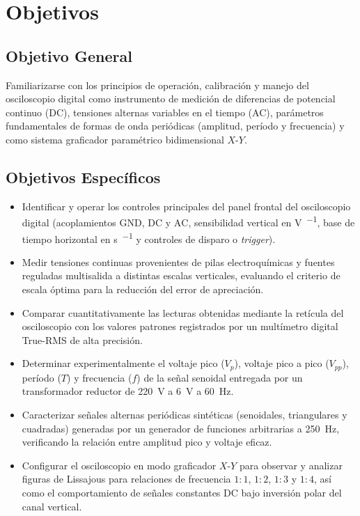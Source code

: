 
\section{Objetivos}
\label{sec:objetivos}

\subsection{Objetivo General}
Familiarizarse con los principios de operación, calibración y manejo del osciloscopio digital como instrumento de medición de diferencias de potencial continuo (DC), tensiones alternas variables en el tiempo (AC), parámetros fundamentales de formas de onda periódicas (amplitud, período y frecuencia) y como sistema graficador paramétrico bidimensional $X$-$Y$.

\subsection{Objetivos Específicos}
\begin{itemize}
    \item Identificar y operar los controles principales del panel frontal del osciloscopio digital (acoplamientos $\text{GND}$, $\text{DC}$ y $\text{AC}$, sensibilidad vertical en \unit{\volt\per\division}, base de tiempo horizontal en \unit{\second\per\division} y controles de disparo o \textit{trigger}).
    \item Medir tensiones continuas provenientes de pilas electroquímicas y fuentes reguladas multisalida a distintas escalas verticales, evaluando el criterio de escala óptima para la reducción del error de apreciación.
    \item Comparar cuantitativamente las lecturas obtenidas mediante la retícula del osciloscopio con los valores patrones registrados por un multímetro digital True-RMS de alta precisión.
    \item Determinar experimentalmente el voltaje pico ($V_p$), voltaje pico a pico ($V_{pp}$), período ($T$) y frecuencia ($f$) de la señal senoidal entregada por un transformador reductor de \qty{220}{\volt} a \qty{6}{\volt} a \qty{60}{\hertz}.
    \item Caracterizar señales alternas periódicas sintéticas (senoidales, triangulares y cuadradas) generadas por un generador de funciones arbitrarias a \qty{250}{\hertz}, verificando la relación entre amplitud pico y voltaje eficaz.
    \item Configurar el osciloscopio en modo graficador $X$-$Y$ para observar y analizar figuras de Lissajous para relaciones de frecuencia $1:1$, $1:2$, $1:3$ y $1:4$, así como el comportamiento de señales constantes DC bajo inversión polar del canal vertical.
\end{itemize}
